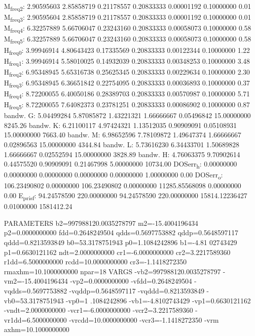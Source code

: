 \documentclass[11pt]{article}
\begin{document}
M\textsubscript{freq}\textsubscript{2}:   2.90595603   2.85858719   0.21178557   0.20833333   0.00001192   0.10000000         0.01
M\textsubscript{freq}\textsubscript{3}:   2.90595604   2.85858719   0.21178557   0.20833333   0.00001192   0.10000000         0.01
M\textsubscript{freq}\textsubscript{4}:   6.32257889   5.66706047   0.23243160   0.20833333   0.00058073   0.10000000         0.58
M\textsubscript{freq}\textsubscript{5}:   6.32257889   5.66706047   0.23243160   0.20833333   0.00058073   0.10000000         0.58
H\textsubscript{freq}\textsubscript{0}:   3.99946914   4.80643423   0.17335569   0.20833333   0.00122344   0.10000000         1.22
H\textsubscript{freq}\textsubscript{1}:   3.99946914   5.58010025   0.14932039   0.20833333   0.00348253   0.10000000         3.48
H\textsubscript{freq}\textsubscript{2}:   6.95348945   5.65316738   0.25625345   0.20833333   0.00229634   0.10000000         2.30
H\textsubscript{freq}\textsubscript{3}:   6.95348945   6.36651842   0.22754095   0.20833333   0.00036893   0.10000000         0.37
H\textsubscript{freq}\textsubscript{4}:   8.72200055   6.40050186   0.28389703   0.20833333   0.00570987   0.10000000         5.71
H\textsubscript{freq}\textsubscript{5}:   8.72200055   7.64082373   0.23781251   0.20833333   0.00086902   0.10000000         0.87
bandw. G:   5.04499284   5.87085872   1.43221321   1.66666667   0.05496842  15.00000000      8245.26
bandw. K:   6.21100117   4.97424321   1.13512035   0.90909091   0.05108931  15.00000000      7663.40
bandw. M:   6.98652596   7.78109872   1.49647374   1.66666667   0.02896563  15.00000000      4344.84
bandw. L:   5.73616230   6.34433701   1.50689828   1.66666667   0.02552594  15.00000000      3828.89
bandw. H:   4.76063375   9.70902614   0.44575520   0.90909091   0.21467998   5.00000000     10734.00
DOSerr\textsubscript{h}:   0.00000000   0.00000000   0.00000000   0.00000000   0.00000000   1.00000000         0.00
DOSerr\textsubscript{o}: 106.23490802   0.00000000 106.23490802   0.00000000 11285.85568098   0.00000000         0.00
E\textsubscript{pris}\textsubscript{f}:  94.24578590 220.00000000  94.24578590 220.00000000 15814.12236427   0.01000000   1581412.24


PARAMETERS
  b2=997988120.0035278797 m2=-15.4004196434 p2=0.0000000000 fdd=0.2648249504 qdds=0.5697753882 qddp=0.5648597117 qddd=0.8213593849 b0=53.3178751943 p0=1.1084242896 b1=-4.81
02743429 p1=0.6630121162 ndt=2.0000000000 cr1=-6.0000000000 cr2=3.2217589360 r1dd=6.5000000000 rcdd=10.0000000000 cr3=-1.1418272350 rmaxhm=10.1000000000 npar=18 
VARGS
    -vb2=997988120.0035278797 -vm2=-15.4004196434 -vp2=0.0000000000 -vfdd=0.2648249504 -vqdds=0.5697753882 -vqddp=0.5648597117 -vqddd=0.8213593849 -vb0=53.3178751943 -vp0=1
.1084242896 -vb1=-4.8102743429 -vp1=0.6630121162 -vndt=2.0000000000 -vcr1=-6.0000000000 -vcr2=3.2217589360 -vr1dd=6.5000000000 -vrcdd=10.0000000000 -vcr3=-1.1418272350 -vrm
axhm=10.1000000000 
\end{document}
